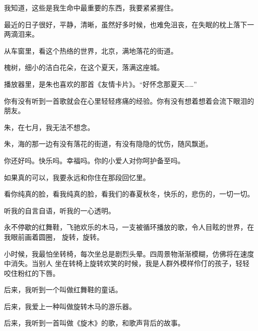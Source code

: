 		我知道，这些是我生命中最重要的东西，我要紧紧握住。

		最近的日子很好，平静，清晰，虽然好多时候，也难免沮丧，在失眠的枕上落下一两滴泪来。

	\endwriting



		从车窗里，看这个热络的世界，北京，满地落花的街道。

		槐树，细小的洁白花朵，在这个夏天，落满这座城。

		播放器里，是朱也喜欢的那首《友情卡片》。“好怀念那夏天……”

		你有没有听到一首歌就会在心里轻轻疼痛的经验。你有没有想着想着会流下眼泪的朋友。

		朱，在七月，我无法不想念。

		朱，海的那一边有没有落花的街道，有没有隐隐的忧伤，随风飘逝。

		你还好吗。快乐吗。幸福吗。你的小爱人对你呵护备至吗。

		如果真的可以，我要永远和你住在那段回忆里。

		看你纯真的脸，看我纯真的脸，看我们的春夏秋冬，快乐的，悲伤的，一切一切。

	\endwriting



		听我的自言自语，听我的一心透明。



		永不停歇的红舞鞋，飞驰欢乐的木马，一支被循环播放的歌，令人目眩的世界，在我眼前画着圆圈，
	旋转，旋转。

		小时候，我最怕坐转椅，每次坐总是剧烈头晕。四周景物渐渐模糊，仿佛将在速度中消失。当别人
	坐在转椅上旋转欢笑的时候，我是人群外模样伶仃的孩子，轻轻咬住粉红的下唇。

		\vspace{1em}
		后来，我听到一个叫做红舞鞋的童话。\par
		后来，我爱上一种叫做旋转木马的游乐器。\par
		后来，我听到一首叫做《旋木》的歌，和歌声背后的故事。

